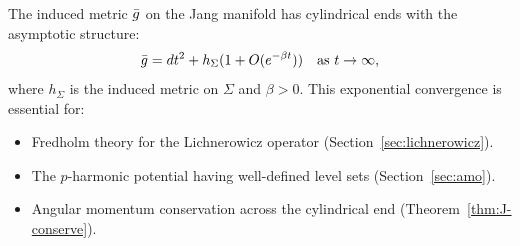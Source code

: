 \begin{remark}
The induced metric $\bar{g}$ on the Jang manifold has cylindrical ends with the asymptotic structure:
\[
\bar{g} = dt^2 + h_{\Sigma}(1 + O(e^{-\beta t})) \quad \text{as } t \to \infty,
\]
where $h_\Sigma$ is the induced metric on $\Sigma$ and $\beta > 0$. This exponential convergence is essential for:
\begin{itemize}
    \item Fredholm theory for the Lichnerowicz operator (Section~\ref{sec:lichnerowicz}).
    \item The $p$-harmonic potential having well-defined level sets (Section~\ref{sec:amo}).
    \item Angular momentum conservation across the cylindrical end (Theorem~\ref{thm:J-conserve}).
\end{itemize}
\end{remark}

